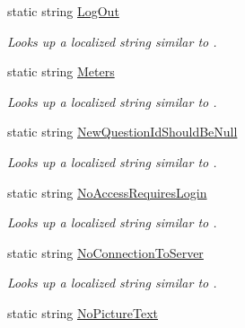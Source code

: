 \begin{DoxyCompactItemize}
static string \hyperlink{class_wis_r_1_1_app___resources_1_1_resource_add1a3fbdb0ad06bca6dc1de399f8cb61}{Log\+Out}
\begin{DoxyCompactList}\small\item\em Looks up a localized string similar to . \end{DoxyCompactList}\item 
static string \hyperlink{class_wis_r_1_1_app___resources_1_1_resource_a5ae7eff4838724f5e3d30fa9e2a9403e}{Meters}
\begin{DoxyCompactList}\small\item\em Looks up a localized string similar to . \end{DoxyCompactList}\item 
static string \hyperlink{class_wis_r_1_1_app___resources_1_1_resource_a0ccce0e9d2c8d127b7cc147fe3f81b9d}{New\+Question\+Id\+Should\+Be\+Null}
\begin{DoxyCompactList}\small\item\em Looks up a localized string similar to . \end{DoxyCompactList}\item 
static string \hyperlink{class_wis_r_1_1_app___resources_1_1_resource_a4d994d4d7b751fafd8d6af1179ef038e}{No\+Access\+Requires\+Login}
\begin{DoxyCompactList}\small\item\em Looks up a localized string similar to . \end{DoxyCompactList}\item 
static string \hyperlink{class_wis_r_1_1_app___resources_1_1_resource_a88a989fe21da288ddc606610c25e2b74}{No\+Connection\+To\+Server}
\begin{DoxyCompactList}\small\item\em Looks up a localized string similar to . \end{DoxyCompactList}\item 
static string \hyperlink{class_wis_r_1_1_app___resources_1_1_resource_ad7425ab3af1ccb60321bc780b1318da2}{No\+Picture\+Text}

\end{DoxyCompactItemize}

